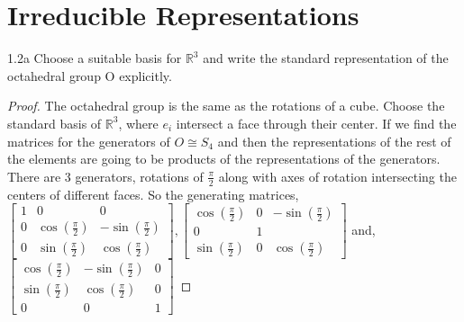 \documentclass{article}
\newcommand{\R}{\mathbb{R}}
\begin{document}
\section{Irreducible Representations}
\begin{PROB}{1.2a}\label{Problem 1.2a.}
    Choose a suitable basis for $\R^3$ and write the standard representation of the octahedral group O explicitly.
\end{PROB}
\begin{proof}
    The octahedral group is the same as the rotations of a cube. Choose the standard basis of $\R^3$, where $e_i$ intersect a face through their center. If we find the matrices for the generators of $O \cong S_4$ and then the representations of the rest of the elements are going to be products of the representations of the generators. There are 3 generators, rotations of $\frac{\pi}{2}$ along with axes of rotation intersecting the centers of different faces. So the generating matrices, $\begin{bmatrix}
        1 & 0 & 0 \\
        0 & \cos(\frac{\pi}{2}) & -\sin(\frac{\pi}{2}) \\
        0 & \sin(\frac{\pi}{2}) & \cos(\frac{\pi}{2})
    \end{bmatrix}, \begin{bmatrix}
        \cos(\frac{\pi}{2}) & 0 & -\sin(\frac{\pi}{2}) \\
        0 & 1 &  \\
        \sin(\frac{\pi}{2}) & 0 & \cos(\frac{\pi}{2})
    \end{bmatrix}$ and, $\begin{bmatrix}
        \cos(\frac{\pi}{2}) & -\sin(\frac{\pi}{2}) & 0 \\
        \sin(\frac{\pi}{2}) & \cos(\frac{\pi}{2}) & 0 \\
        0 & 0 & 1
    \end{bmatrix}$
\end{proof}
\end{document}

